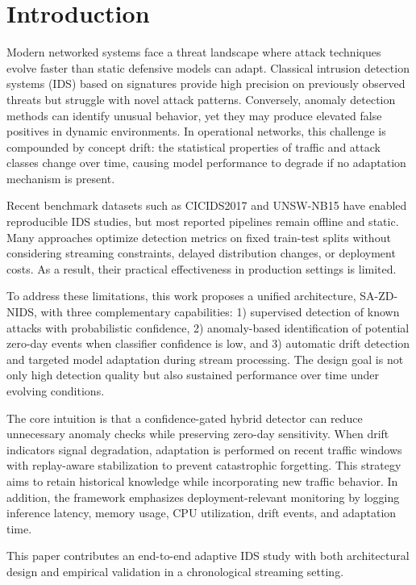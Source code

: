 \documentclass[conference]{IEEEtran}
\begin{document}
\section{Introduction}
Modern networked systems face a threat landscape where attack techniques evolve faster than static defensive models can adapt. Classical intrusion detection systems (IDS) based on signatures provide high precision on previously observed threats but struggle with novel attack patterns. Conversely, anomaly detection methods can identify unusual behavior, yet they may produce elevated false positives in dynamic environments. In operational networks, this challenge is compounded by concept drift: the statistical properties of traffic and attack classes change over time, causing model performance to degrade if no adaptation mechanism is present.

Recent benchmark datasets such as CICIDS2017 \cite{sharafaldin2018toward} and UNSW-NB15 \cite{moustafa2015unsw} have enabled reproducible IDS studies, but most reported pipelines remain offline and static. Many approaches optimize detection metrics on fixed train-test splits without considering streaming constraints, delayed distribution changes, or deployment costs. As a result, their practical effectiveness in production settings is limited.

To address these limitations, this work proposes a unified architecture, SA-ZD-NIDS, with three complementary capabilities: 1) supervised detection of known attacks with probabilistic confidence, 2) anomaly-based identification of potential zero-day events when classifier confidence is low, and 3) automatic drift detection and targeted model adaptation during stream processing. The design goal is not only high detection quality but also sustained performance over time under evolving conditions.

The core intuition is that a confidence-gated hybrid detector can reduce unnecessary anomaly checks while preserving zero-day sensitivity. When drift indicators signal degradation, adaptation is performed on recent traffic windows with replay-aware stabilization to prevent catastrophic forgetting. This strategy aims to retain historical knowledge while incorporating new traffic behavior. In addition, the framework emphasizes deployment-relevant monitoring by logging inference latency, memory usage, CPU utilization, drift events, and adaptation time.

This paper contributes an end-to-end adaptive IDS study with both architectural design and empirical validation in a chronological streaming setting.
\end{document}
